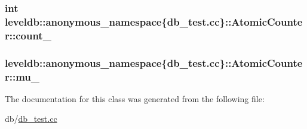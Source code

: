 \subsubsection[{count\+\_\+}]{\setlength{\rightskip}{0pt plus 5cm}int leveldb\+::anonymous\+\_\+namespace\{db\+\_\+test.\+cc\}\+::Atomic\+Counter\+::count\+\_\+\hspace{0.3cm}{\ttfamily [private]}}\label{classleveldb_1_1anonymous__namespace_02db__test_8cc_03_1_1_atomic_counter_ac6f3cf697a1b5e480da0f1ac30775bc2}
\hypertarget{classleveldb_1_1anonymous__namespace_02db__test_8cc_03_1_1_atomic_counter_a4ff92b96ee462ae498f2d2a661e9f806}{}
\subsubsection[{mu\+\_\+}]{ leveldb\+::anonymous\+\_\+namespace\{db\+\_\+test.\+cc\}\+::Atomic\+Counter\+::mu\+\_\+\hspace{0.3cm}{\ttfamily [private]}}\label{classleveldb_1_1anonymous__namespace_02db__test_8cc_03_1_1_atomic_counter_a4ff92b96ee462ae498f2d2a661e9f806}


The documentation for this class was generated from the following file\+:\begin{DoxyCompactItemize}
\item 
db/\hyperlink{db__test_8cc}{db\+\_\+test.\+cc}\end{DoxyCompactItemize}
